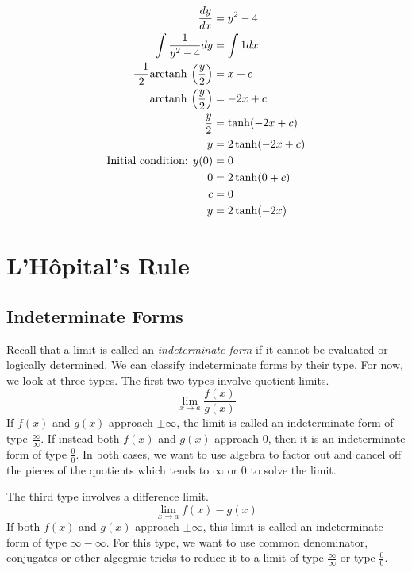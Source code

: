 \documentclass[fleqn]{report}
\begin{document}
\begin{example}
\begin{align*}
\frac{dy}{dx} & = y^2 - 4 \\
\int \frac{1}{y^2-4} dy & = \int 1 dx \\
\frac{-1}{2} \mathrm{arctanh\hspace{0.07cm}} \left( \frac{y}{2} \right) & = x + c \\
\mathrm{arctanh\hspace{0.07cm}} \left( \frac{y}{2} \right) & = -2x + c \\
\frac{y}{2} & = \tanh (-2x + c) \\
y & = 2 \tanh (-2x + c) \\
\text{Initial condition: } y(0) & = 0 \\
0 & = 2 \tanh (0 + c) \\
c & = 0 \\
y & = 2 \tanh (-2x)
\end{align*}
\end{example}

\chapter{L'H\^opital's Rule}
\label{L'Hopital's Rule}

\section*{Indeterminate Forms}

Recall that a limit is called an \emph{indeterminate form} if
it cannot be evaluated or logically determined. We can
classify indeterminate forms by their type. For now, we look
at three types. The first two types involve quotient limits.
\begin{equation*}
\lim_{x \rightarrow a} \frac{f(x)}{g(x)}
\end{equation*}
If $f(x)$ and $g(x)$ approach $\pm \infty$, the limit is called
an indeterminate form of type $\frac{\infty}{\infty}$. If
instead both $f(x)$ and $g(x)$ approach $0$, then it is an
indeterminate form of type $\frac{0}{0}$. In both cases, we
want to use algebra to factor out and cancel off the pieces of
the quotients which tends to $\infty$ or $0$ to solve the
limit.

The third type involves a difference limit.
\begin{equation*}
\lim_{x \rightarrow a} f(x) - g(x)
\end{equation*}
If both $f(x)$ and $g(x)$ approach $\pm \infty$, this limit is
called an indeterminate form of type $\infty - \infty$. For
this type, we want to use common denominator, conjugates or
other algegraic tricks to reduce it to a limit of type
$\frac{\infty}{\infty}$ or type $\frac{0}{0}$.
\end{document}
